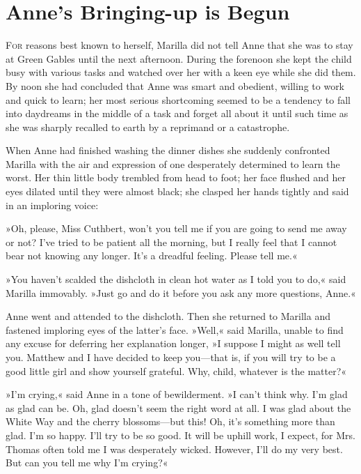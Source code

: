 \chapter{Anne’s Bringing-up is Begun}

\lettrine[lines=4]{F}{or} reasons best known to herself, Marilla did not tell Anne that she was to stay at Green Gables until the next afternoon. During the forenoon she kept the child busy with various tasks and watched over her with a keen eye while she did them. By noon she had concluded that Anne was smart and obedient, willing to work and quick to learn; her most serious shortcoming seemed to be a tendency to fall into daydreams in the middle of a task and forget all about it until such time as she was sharply recalled to earth by a reprimand or a catastrophe.

When Anne had finished washing the dinner dishes she suddenly confronted Marilla with the air and expression of one desperately determined to learn the worst. Her thin little body trembled from head to foot; her face flushed and her eyes dilated until they were almost black; she clasped her hands tightly and said in an imploring voice:

»Oh, please, Miss Cuthbert, won’t you tell me if you are going to send me away or not? I’ve tried to be patient all the morning, but I really feel that I cannot bear not knowing any longer. It’s a dreadful feeling. Please tell me.«

»You haven’t scalded the dishcloth in clean hot water as I told you to do,« said Marilla immovably. »Just go and do it before you ask any more questions, Anne.«

Anne went and attended to the dishcloth. Then she returned to Marilla and fastened imploring eyes of the latter’s face. »Well,« said Marilla, unable to find any excuse for deferring her explanation longer, »I suppose I might as well tell you. Matthew and I have decided to keep you—that is, if you will try to be a good little girl and show yourself grateful. Why, child, whatever is the matter?«

»I’m crying,« said Anne in a tone of bewilderment. »I can’t think why. I’m glad as glad can be. Oh, glad doesn’t seem the right word at all. I was glad about the White Way and the cherry blossoms—but this! Oh, it’s something more than glad. I’m so happy. I’ll try to be so good. It will be uphill work, I expect, for Mrs. Thomas often told me I was desperately wicked. However, I’ll do my very best. But can you tell me why I’m crying?«

